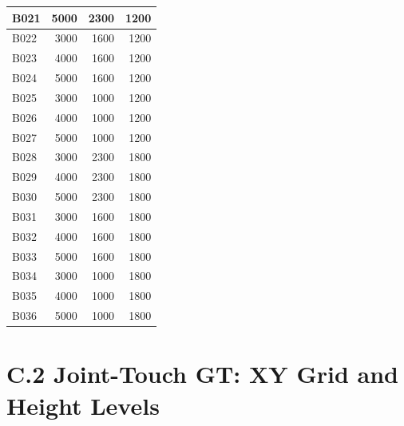 {\begin{longtable}{|l|r|r|r|}
\hline
B021 & 5000 & 2300 & 1200 \\
\hline
B022 & 3000 & 1600 & 1200 \\
\hline
B023 & 4000 & 1600 & 1200 \\
\hline
B024 & 5000 & 1600 & 1200 \\
\hline
B025 & 3000 & 1000 & 1200 \\
\hline
B026 & 4000 & 1000 & 1200 \\
\hline
B027 & 5000 & 1000 & 1200 \\
\hline
B028 & 3000 & 2300 & 1800 \\
\hline
B029 & 4000 & 2300 & 1800 \\
\hline
B030 & 5000 & 2300 & 1800 \\
\hline
B031 & 3000 & 1600 & 1800 \\
\hline
B032 & 4000 & 1600 & 1800 \\
\hline
B033 & 5000 & 1600 & 1800 \\
\hline
B034 & 3000 & 1000 & 1800 \\
\hline
B035 & 4000 & 1000 & 1800 \\
\hline
B036 & 5000 & 1000 & 1800 \\
\hline
\end{longtable}
}

\section*{C.2 Joint-Touch GT: XY Grid and Height Levels}

